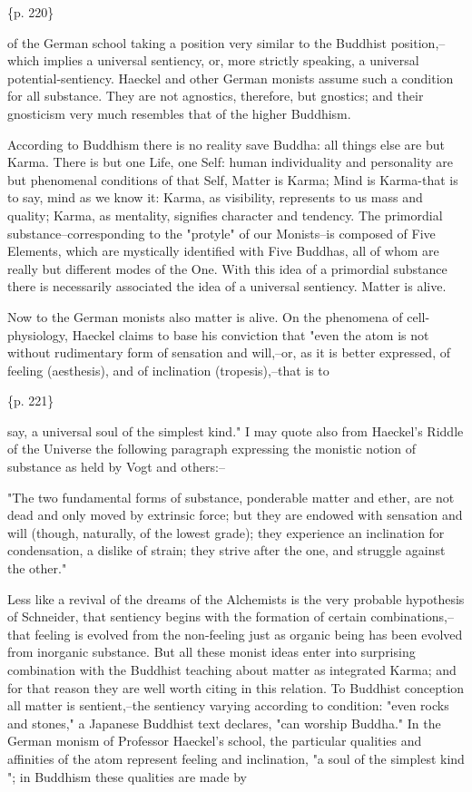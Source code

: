 \{p. 220\}

of the German school taking a position very similar to the Buddhist position,--which implies a universal sentiency, or, more strictly speaking, a universal potential-sentiency. Haeckel and other German monists assume such a condition for all substance. They are not agnostics, therefore, but gnostics; and their gnosticism very much resembles that of the higher Buddhism.

According to Buddhism there is no reality save Buddha: all things else are but Karma. There is but one Life, one Self: human individuality and personality are but phenomenal conditions of that Self, Matter is Karma; Mind is Karma-that is to say, mind as we know it: Karma, as visibility, represents to us mass and quality; Karma, as mentality, signifies character and tendency. The primordial substance--corresponding to the "protyle" of our Monists--is composed of Five Elements, which are mystically identified with Five Buddhas, all of whom are really but different modes of the One. With this idea of a primordial substance there is necessarily associated the idea of a universal sentiency. Matter is alive.

Now to the German monists also matter is alive. On the phenomena of cell-physiology, Haeckel claims to base his conviction that "even the atom is not without rudimentary form of sensation and will,--or, as it is better expressed, of feeling (aesthesis), and of inclination (tropesis),--that is to

\{p. 221\}

say, a universal soul of the simplest kind." I may quote also from Haeckel's Riddle of the Universe the following paragraph expressing the monistic notion of substance as held by Vogt and others:--

"The two fundamental forms of substance, ponderable matter and ether, are not dead and only moved by extrinsic force; but they are endowed with sensation and will (though, naturally, of the lowest grade); they experience an inclination for condensation, a dislike of strain; they strive after the one, and struggle against the other."

Less like a revival of the dreams of the Alchemists is the very probable hypothesis of Schneider, that sentiency begins with the formation of certain combinations,--that feeling is evolved from the non-feeling just as organic being has been evolved from inorganic substance. But all these monist ideas enter into surprising combination with the Buddhist teaching about matter as integrated Karma; and for that reason they are well worth citing in this relation. To Buddhist conception all matter is sentient,--the sentiency varying according to condition: "even rocks and stones," a Japanese Buddhist text declares, "can worship Buddha." In the German monism of Professor Haeckel's school, the particular qualities and affinities of the atom represent feeling and inclination, "a soul of the simplest kind "; in Buddhism these qualities are made by

